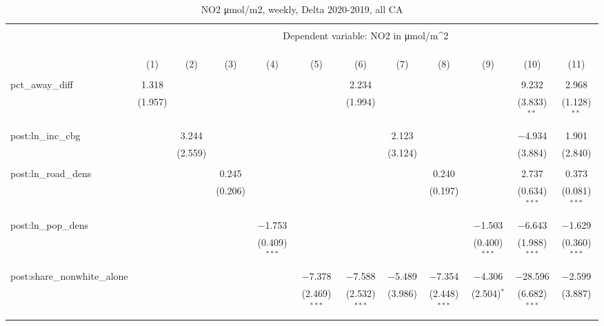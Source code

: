 
\begin{table}[!htbp] \centering 
  \caption{NO2 μmol/m2, weekly, Delta 2020-2019, all CA} 
  \label{} 
\begin{tabular}{@{\extracolsep{5pt}}lccccccccccc} 
\\[-1.8ex]\hline 
\hline \\[-1.8ex] 
 & \multicolumn{11}{c}{Dependent variable: NO2 in μmol/m^2} \\ 
\cline{2-12} 
\\[-1.8ex] & \multicolumn{11}{c}{} \\ 
\\[-1.8ex] & (1) & (2) & (3) & (4) & (5) & (6) & (7) & (8) & (9) & (10) & (11)\\ 
\hline \\[-1.8ex] 
 pct\_away\_diff & 1.318 &  &  &  &  & 2.234 &  &  &  & 9.232 & 2.968 \\ 
  & (1.957) &  &  &  &  & (1.994) &  &  &  & (3.833)$^{**}$ & (1.128)$^{**}$ \\ 
  & & & & & & & & & & & \\ 
 post:ln\_inc\_cbg &  & 3.244 &  &  &  &  & 2.123 &  &  & $-$4.934 & 1.901 \\ 
  &  & (2.559) &  &  &  &  & (3.124) &  &  & (3.884) & (2.840) \\ 
  & & & & & & & & & & & \\ 
 post:ln\_road\_dens &  &  & 0.245 &  &  &  &  & 0.240 &  & 2.737 & 0.373 \\ 
  &  &  & (0.206) &  &  &  &  & (0.197) &  & (0.634)$^{***}$ & (0.081)$^{***}$ \\ 
  & & & & & & & & & & & \\ 
 post:ln\_pop\_dens &  &  &  & $-$1.753 &  &  &  &  & $-$1.503 & $-$6.643 & $-$1.629 \\ 
  &  &  &  & (0.409)$^{***}$ &  &  &  &  & (0.400)$^{***}$ & (1.988)$^{***}$ & (0.360)$^{***}$ \\ 
  & & & & & & & & & & & \\ 
 post:share\_nonwhite\_alone &  &  &  &  & $-$7.378 & $-$7.588 & $-$5.489 & $-$7.354 & $-$4.306 & $-$28.596 & $-$2.599 \\ 
  &  &  &  &  & (2.469)$^{***}$ & (2.532)$^{***}$ & (3.986) & (2.448)$^{***}$ & (2.504)$^{*}$ & (6.682)$^{***}$ & (3.887) \\ 
  & & & & & & & & & & & \\ 

\end{tabular}
\end{table}
